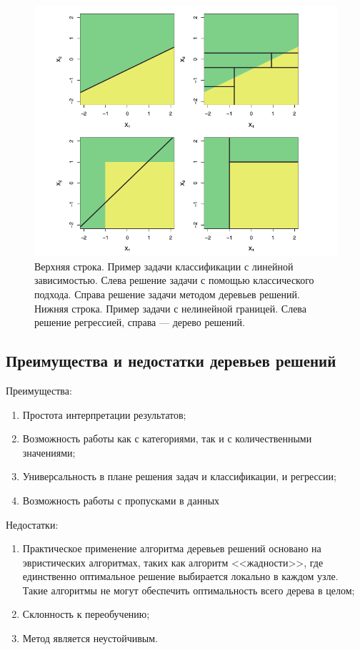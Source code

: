 \documentclass[14pt, a4paper]{article}
\begin{document}
\begin{figure}[h!]
\label{fig:treevsLM}
\centering
\includegraphics[scale=0.5]{treevsLM}
\caption{Верхняя строка. Пример задачи классификации с линейной зависимостью. Слева решение задачи с помощью классического подхода. Справа решение задачи методом деревьев решений. Нижняя строка. Пример задачи с нелинейной границей. Слева решение регрессией, справа --- дерево решений.}
\end{figure}

\subsection{Преимущества и недостатки деревьев решений}

Преимущества:
\begin{enumerate}
\item Простота интерпретации результатов;
\item Возможность работы как с категориями, так и с количественными значениями;
\item Универсальность в плане решения задач и классификации, и регрессии;
\item Возможность работы с пропусками в данных
\end{enumerate}

Недостатки:
\begin{enumerate}
\item Практическое применение алгоритма деревьев решений основано на эвристических алгоритмах, таких как алгоритм <<жадности>>, где единственно оптимальное решение выбирается локально в каждом узле. Такие алгоритмы не могут обеспечить оптимальность всего дерева в целом;
\item Склонность к переобучению;
\item Метод является неустойчивым. 
\end{enumerate}
\end{document}
